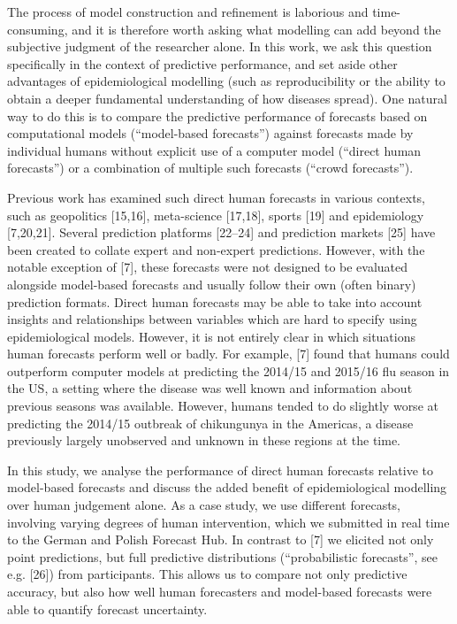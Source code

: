 \documentclass[10pt,letterpaper]{article}
\begin{document}
The process of model construction and refinement is laborious and
time-consuming, and it is therefore worth asking what modelling can add
beyond the subjective judgment of the researcher alone. In this work, we
ask this question specifically in the context of predictive performance,
and set aside other advantages of epidemiological modelling (such as
reproducibility or the ability to obtain a deeper fundamental
understanding of how diseases spread). One natural way to do this is to
compare the predictive performance of forecasts based on computational
models (``model-based forecasts'') against forecasts made by individual
humans without explicit use of a computer model (``direct human
forecasts'') or a combination of multiple such forecasts (``crowd
forecasts'').

Previous work has examined such direct human forecasts in various
contexts, such as geopolitics {[}15,16{]}, meta-science {[}17,18{]},
sports {[}19{]} and epidemiology {[}7,20,21{]}. Several prediction
platforms {[}22--24{]} and prediction markets {[}25{]} have been created
to collate expert and non-expert predictions. However, with the notable
exception of {[}7{]}, these forecasts were not designed to be evaluated
alongside model-based forecasts and usually follow their own (often
binary) prediction formats. Direct human forecasts may be able to take
into account insights and relationships between variables which are hard
to specify using epidemiological models. However, it is not entirely
clear in which situations human forecasts perform well or badly. For
example, {[}7{]} found that humans could outperform computer models at
predicting the 2014/15 and 2015/16 flu season in the US, a setting where
the disease was well known and information about previous seasons was
available. However, humans tended to do slightly worse at predicting the
2014/15 outbreak of chikungunya in the Americas, a disease previously
largely unobserved and unknown in these regions at the time.

In this study, we analyse the performance of direct human forecasts
relative to model-based forecasts and discuss the added benefit of
epidemiological modelling over human judgement alone. As a case study,
we use different forecasts, involving varying degrees of human
intervention, which we submitted in real time to the German and Polish
Forecast Hub. In contrast to {[}7{]} we elicited not only point
predictions, but full predictive distributions (``probabilistic
forecasts'', see e.g. {[}26{]}) from participants. This allows us to
compare not only predictive accuracy, but also how well human
forecasters and model-based forecasts were able to quantify forecast
uncertainty.
\end{document}
